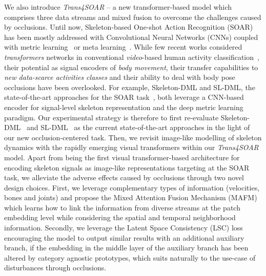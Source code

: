 \documentclass[lettersize,journal]{IEEEtran}
\begin{document}
We also introduce \textit{Trans4SOAR} -- a new transformer-based model which comprises three data streams and mixed fusion to overcome the challenges caused by occlusions. 
Until now, Skeleton-based One-shot Action Recognition (SOAR) has been mostly addressed with Convolutional Neural Networks (CNNs) coupled with metric learning~\cite{memmesheimer2020skeleton_dml,memmesheimer2021sl,zou2018hierarchical} or meta learning~\cite{zou2020adaptation}.
While few recent works considered \textit{transformers} networks in conventional \textit{video}-based human activity classification~\cite{arnab2021vivit}, their potential as signal encoders of \textit{body movement}, their transfer capabilities to \textit{new data-scarce activities classes} and their ability to deal with body pose occlusions have been overlooked. 
For example, Skeleton-DML and SL-DML, the state-of-the-art approaches for the SOAR task~\cite{memmesheimer2020skeleton_dml,memmesheimer2021sl}, both leverage a CNN-based encoder for signal-level skeleton representation and the deep metric learning paradigm.
Our experimental strategy is therefore to first re-evaluate Skeleton-DML~\cite{memmesheimer2020skeleton_dml} and SL-DML~\cite{memmesheimer2021sl} as the current state-of-the-art approaches in the light of our new occlusion-centered task. 
Then, we revisit image-like modelling of skeleton dynamics with the rapidly emerging visual transformers within our \textit{Trans4SOAR} model.
Apart from being the first visual transformer-based architecture for encoding skeleton signals as image-like representations targeting at the SOAR task, we alleviate the adverse effects caused by occlusions through two novel design choices. First, we leverage complementary types of information (velocities, bones and joints) and propose the Mixed Attention Fusion Mechanism (MAFM) which learns how to link the information from diverse streams at the patch embedding level while considering the spatial and temporal neighborhood information.
Secondly, we leverage the Latent Space Consistency (LSC) loss encouraging the model to output similar results with an additional auxiliary branch, if the embedding in the middle layer of the auxiliary branch has been altered by category agnostic prototypes, which suits naturally to the use-case of disturbances through occlusions.
\end{document}
